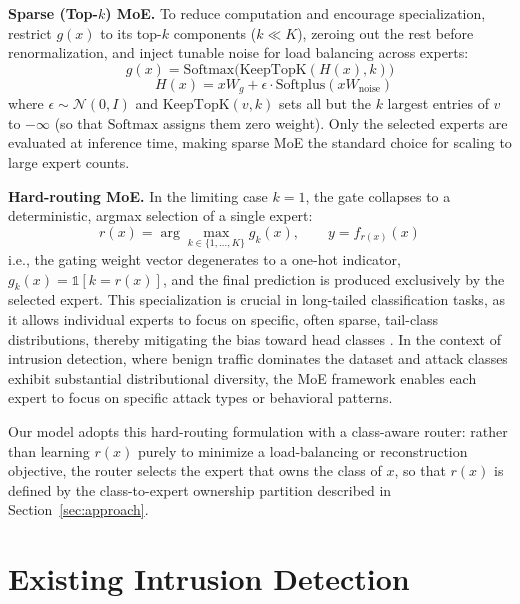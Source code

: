 \documentclass[sigconf]{acmart}
\begin{document}
\textbf{Sparse (Top-$k$) MoE.} To reduce computation and encourage specialization, \citet{shazeer2017outrageously} restrict $g(x)$ to its top-$k$ components ($k \ll K$), zeroing out the rest before renormalization, and inject tunable noise for load balancing across experts:
\begin{equation}
g(x) = \mathrm{Softmax}\big(\mathrm{KeepTopK}(H(x), k)\big)
\end{equation}
\begin{equation}
    \qquad H(x) = xW_g + \epsilon \cdot \mathrm{Softplus}(xW_{\mathrm{noise}})
\end{equation}
where $\epsilon \sim \mathcal{N}(0, I)$ and $\mathrm{KeepTopK}(v, k)$ sets all but the $k$ largest entries of $v$ to $-\infty$ (so that $\mathrm{Softmax}$ assigns them zero weight). Only the selected experts are evaluated at inference time, making sparse MoE the standard choice for scaling to large expert counts.

\textbf{Hard-routing MoE.} In the limiting case $k=1$, the gate collapses to a deterministic, argmax selection of a single expert:
\begin{equation}
r(x) = \arg\max_{k \in \{1,\dots,K\}} g_k(x), \qquad y = f_{r(x)}(x)
\end{equation}
i.e., the gating weight vector degenerates to a one-hot indicator, $g_k(x) = \mathbb{1}[k = r(x)]$, and the final prediction is produced exclusively by the selected expert. This specialization is crucial in long-tailed classification tasks, as it allows individual experts to focus on specific, often sparse, tail-class distributions, thereby mitigating the bias toward head classes \citep{wang2020long}. In the context of intrusion detection, where benign traffic dominates the dataset and attack classes exhibit substantial distributional diversity, the MoE framework enables each expert to focus on specific attack types or behavioral patterns.

Our model adopts this hard-routing formulation with a class-aware router: rather than learning $r(x)$ purely to minimize a load-balancing or reconstruction objective, the router selects the expert that owns the class of $x$, so that $r(x)$ is defined by the class-to-expert ownership partition described in Section~\ref{sec:approach}.%

\section{Existing Intrusion Detection}
\label{sec:existing}
\end{document}
